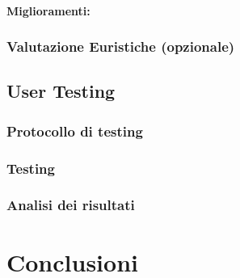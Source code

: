\documentclass[../Report.tex]{subfiles}
\begin{document}
    \subsubsection{Miglioramenti:}

    
    \subsection{Valutazione Euristiche (opzionale)}
    \section{User Testing}
    \subsection{Protocollo di testing}
    \subsection{Testing}
    \subsection{Analisi dei risultati}

    \chapter{Conclusioni}
\end{document}
